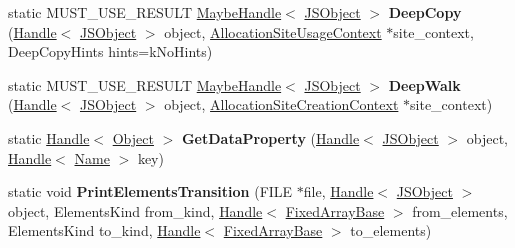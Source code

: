 \begin{DoxyCompactItemize}
\item 
\hypertarget{classv8_1_1internal_1_1_j_s_object_ac9960aabe80faad206601c372bf047fc}{}static M\+U\+S\+T\+\_\+\+U\+S\+E\+\_\+\+R\+E\+S\+U\+L\+T \hyperlink{classv8_1_1internal_1_1_maybe_handle}{Maybe\+Handle}$<$ \hyperlink{classv8_1_1internal_1_1_j_s_object}{J\+S\+Object} $>$ {\bfseries Deep\+Copy} (\hyperlink{classv8_1_1internal_1_1_handle}{Handle}$<$ \hyperlink{classv8_1_1internal_1_1_j_s_object}{J\+S\+Object} $>$ object, \hyperlink{classv8_1_1internal_1_1_allocation_site_usage_context}{Allocation\+Site\+Usage\+Context} $\ast$site\+\_\+context, Deep\+Copy\+Hints hints=k\+No\+Hints)\label{classv8_1_1internal_1_1_j_s_object_ac9960aabe80faad206601c372bf047fc}

\item 
\hypertarget{classv8_1_1internal_1_1_j_s_object_aada2466600a7a86aab516f0bbec7fa00}{}static M\+U\+S\+T\+\_\+\+U\+S\+E\+\_\+\+R\+E\+S\+U\+L\+T \hyperlink{classv8_1_1internal_1_1_maybe_handle}{Maybe\+Handle}$<$ \hyperlink{classv8_1_1internal_1_1_j_s_object}{J\+S\+Object} $>$ {\bfseries Deep\+Walk} (\hyperlink{classv8_1_1internal_1_1_handle}{Handle}$<$ \hyperlink{classv8_1_1internal_1_1_j_s_object}{J\+S\+Object} $>$ object, \hyperlink{classv8_1_1internal_1_1_allocation_site_creation_context}{Allocation\+Site\+Creation\+Context} $\ast$site\+\_\+context)\label{classv8_1_1internal_1_1_j_s_object_aada2466600a7a86aab516f0bbec7fa00}

\item 
\hypertarget{classv8_1_1internal_1_1_j_s_object_a8d71de57d2d88076957660cd3f5593f3}{}static \hyperlink{classv8_1_1internal_1_1_handle}{Handle}$<$ \hyperlink{classv8_1_1internal_1_1_object}{Object} $>$ {\bfseries Get\+Data\+Property} (\hyperlink{classv8_1_1internal_1_1_handle}{Handle}$<$ \hyperlink{classv8_1_1internal_1_1_j_s_object}{J\+S\+Object} $>$ object, \hyperlink{classv8_1_1internal_1_1_handle}{Handle}$<$ \hyperlink{classv8_1_1internal_1_1_name}{Name} $>$ key)\label{classv8_1_1internal_1_1_j_s_object_a8d71de57d2d88076957660cd3f5593f3}

\item 
\hypertarget{classv8_1_1internal_1_1_j_s_object_ae3b6b123db0ee16d21150f68d6901700}{}static void {\bfseries Print\+Elements\+Transition} (F\+I\+L\+E $\ast$file, \hyperlink{classv8_1_1internal_1_1_handle}{Handle}$<$ \hyperlink{classv8_1_1internal_1_1_j_s_object}{J\+S\+Object} $>$ object, Elements\+Kind from\+\_\+kind, \hyperlink{classv8_1_1internal_1_1_handle}{Handle}$<$ \hyperlink{classv8_1_1internal_1_1_fixed_array_base}{Fixed\+Array\+Base} $>$ from\+\_\+elements, Elements\+Kind to\+\_\+kind, \hyperlink{classv8_1_1internal_1_1_handle}{Handle}$<$ \hyperlink{classv8_1_1internal_1_1_fixed_array_base}{Fixed\+Array\+Base} $>$ to\+\_\+elements)\label{classv8_1_1internal_1_1_j_s_object_ae3b6b123db0ee16d21150f68d6901700}


\end{DoxyCompactItemize}

